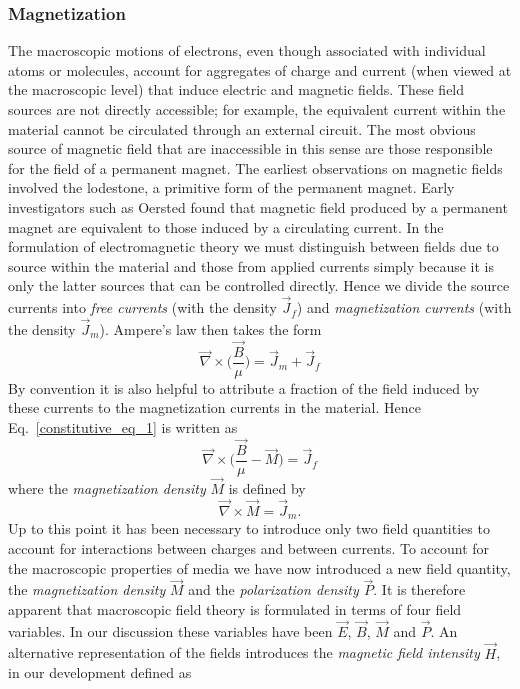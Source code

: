 \documentclass[11pt,a4paper,oneside]{book}
\numberwithin{equation}{section}
\theoremstyle{it}
\theoremstyle{definition}
\begin{document}
\subsubsection{Magnetization}
The macroscopic motions of electrons, even though associated with individual atoms or molecules, account for aggregates of charge and current (when viewed at the macroscopic level) that induce electric and magnetic fields. These field sources are not directly accessible; for example, the equivalent current within the material cannot be circulated through an external circuit. The most obvious source of magnetic field that are inaccessible in this sense are those responsible for the field of a permanent magnet. The earliest observations on magnetic fields involved the lodestone, a primitive form of the permanent magnet. Early investigators such as Oersted found that magnetic field produced by a permanent magnet are equivalent to those induced by a circulating current. In the formulation of electromagnetic theory we must distinguish between fields due to source within the material and those from applied currents simply because it is only the latter sources that can be controlled directly. Hence we divide the source currents into \textit{free currents} (with the density $\vec{J}_f$) and \textit{magnetization currents} (with the density $\vec{J}_m$). Ampere's law then takes the form
\begin{equation}\label{constitutive_eq_1}
	\vec{\nabla}\times\Big(\frac{\vec{B}}{\mu}\Big)= \vec{J}_m+\vec{J}_f
\end{equation}
By convention it is also helpful to attribute a fraction of the field induced by these currents to the magnetization currents in the material. Hence Eq.~\eqref{constitutive_eq_1} is written as
\begin{equation}\label{constitutive_eq_2}
	\vec{\nabla}\times\Big(\frac{\vec{B}}{\mu}-\vec{M}\Big)= \vec{J}_f
\end{equation}
where the \textit{magnetization density} $\vec{M}$ is defined by
\begin{equation}\label{constitutive_eq_3}
	\vec{\nabla}\times\vec{M}= \vec{J}_m.
\end{equation}
Up to this point it has been necessary to introduce only two field quantities to account for interactions between charges and between currents. To account for the macroscopic properties of media we have now introduced a new field quantity, the \textit{magnetization density} $\vec{M}$ and the \textit{polarization density} $\vec{P}$.  It is therefore apparent that macroscopic field theory is formulated in terms of four field variables. In our discussion these variables have been $\vec{E}$, $\vec{B}$, $\vec{M}$ and $\vec{P}$. An alternative representation of the fields introduces the \textit{magnetic field intensity} $\vec{H}$, in our development defined as 
\end{document}
